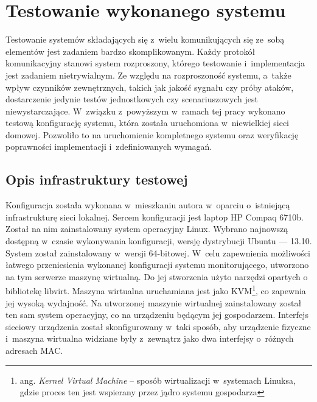 \chapter{Testowanie wykonanego systemu}
\label{chap:Testy}

Testowanie systemów składających się z~wielu komunikujących się
ze~sobą elementów jest zadaniem bardzo skomplikowanym. Każdy protokół
komunikacyjny stanowi system rozproszony, którego testowanie
i~implementacja jest zadaniem nietrywialnym. Ze względu na
rozproszoność systemu, a~także wpływ czynników zewnętrznych, takich
jak jakość sygnału czy próby ataków, dostarczenie jedynie testów
jednostkowych czy scenariuszowych jest niewystarczające. W~związku
z~powyższym w~ramach tej pracy wykonano testową konfigurację systemu,
która została uruchomiona w~niewielkiej sieci domowej. Pozwoliło to na
uruchomienie kompletnego systemu oraz weryfikację poprawności
implementacji i~zdefiniowanych wymagań.

\section[Opis infrastruktury][Opis infrastruktury testowej]{Opis infrastruktury testowej}

Konfiguracja została wykonana w~mieszkaniu autora w~oparciu
o~istniejącą infrastrukturę sieci lokalnej. Sercem konfiguracji jest
laptop HP Compaq 6710b. Został na nim zainstalowany system operacyjny
Linux. Wybrano najnowszą dostępną w~czasie wykonywania konfiguracji,
wersję dystrybucji Ubuntu --- 13.10. System został zainstalowany
w~wersji 64-bitowej. W~celu zapewnienia możliwości łatwego
przeniesienia wykonanej konfiguracji systemu monitorującego, utworzono
na tym serwerze maszynę wirtualną. Do jej stworzenia użyto narzędzi
opartych o bibliotekę libvirt. Maszyna wirtualna uruchamiana jest jako
KVM\footnote{ang. {\em Kernel Virtual Machine} -- sposób wirtualizacji
  w~systemach Linuksa, gdzie proces ten jest wspierany przez jądro
  systemu gospodarza}, co zapewnia jej wysoką wydajność. Na utworzonej
maszynie wirtualnej zainstalowany został ten sam system operacyjny, co
na urządzeniu będącym jej gospodarzem. Interfejs sieciowy urządzenia
został skonfigurowany w~taki sposób, aby urządzenie fizyczne i~maszyna
wirtualna widziane były z~zewnątrz jako dwa interfejsy o~różnych
adresach MAC.

